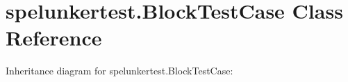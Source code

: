 \hypertarget{classspelunkertest_1_1BlockTestCase}{}\section{spelunkertest.\+Block\+Test\+Case Class Reference}
\label{classspelunkertest_1_1BlockTestCase}


Inheritance diagram for spelunkertest.\+Block\+Test\+Case\+:
